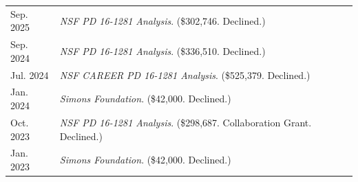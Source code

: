
    \medskip


    \medskip
    
    \begin{center}
    {
    \renewcommand{\arraystretch}{1.5}
    \begin{longtable}{p{}  p{}}
     Sep.  2025 & \textit{NSF PD 16-1281 Analysis}. (\$302,746. Declined.) \\ 
 Sep.  2024 & \textit{NSF PD 16-1281 Analysis}. (\$336,510. Declined.) \\ 
 Jul.  2024 & \textit{NSF CAREER PD 16-1281 Analysis}. (\$525,379. Declined.) \\ 
 Jan.  2024 & \textit{Simons Foundation}. (\$42,000. Declined.) \\ 
 Oct.  2023 & \textit{NSF PD 16-1281 Analysis}. (\$298,687. Collaboration Grant. Declined.) \\ 
 Jan.  2023 & \textit{Simons Foundation}. (\$42,000. Declined.) 
    \end{longtable}
    } 
    \end{center}

    \vspace{-1em}
    